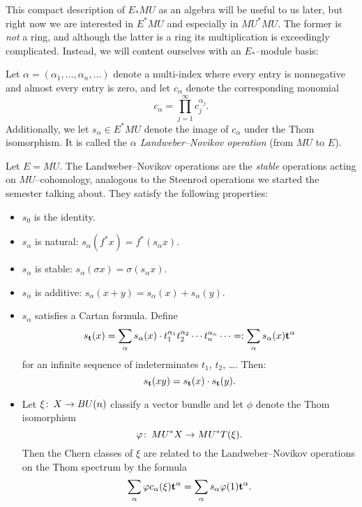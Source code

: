 \noindent This compact description of $E_* MU$ as an algebra will be useful to us later, but right now we are interested in $E^* MU$ and especially in $MU^* MU$.  The former is \emph{not} a ring, and although the latter is a ring its multiplication is exceedingly complicated.  Instead, we will content ourselves with an $E_*$--module basis:
\begin{definition}
Let $\alpha = (\alpha_1, \ldots, \alpha_n, \ldots)$ denote a multi-index where every entry is nonnegative and almost every entry is zero, and let $c_\alpha$ denote the corresponding monomial \[c_\alpha = \prod_{j=1}^\infty c_j^{\alpha_j}.\]  Additionally, we let $s_\alpha \in E^* MU$ denote the image of $c_\alpha$ under the Thom isomorphism.  It is called the \textit{$\alpha${\th} Landweber--Novikov operation} (from $MU$ to $E$).
\end{definition}

\begin{remark}
Let $E = MU$.  The Landweber--Novikov operations are the \emph{stable} operations acting on $MU$--cohomology, analogous to the Steenrod operations we started the semester talking about.  They satisfy the following properties:
\begin{itemize}
\item $s_0$ is the identity.
\item $s_\alpha$ is natural: $s_\alpha(f^* x) = f^*(s_\alpha x)$.
\item $s_\alpha$ is stable: $s_\alpha(\sigma x) = \sigma(s_\alpha x)$.
\item $s_\alpha$ is additive: $s_\alpha(x + y) = s_\alpha(x) + s_\alpha(y)$.
\item $s_\alpha$ satisfies a Cartan formula.  Define \[s_{\mathbf t}(x) = \sum_\alpha s_\alpha(x) \cdot t_1^{\alpha_1} t_2^{\alpha_2} \cdots t_n^{\alpha_n} \cdots =: \sum_{\alpha} s_\alpha(x) \mathbf t^\alpha\] for an infinite sequence of indeterminates $t_1$, $t_2$, \ldots.  Then: \[s_{\mathbf t}(x y) = s_{\mathbf t}(x) \cdot s_{\mathbf t}(y).\]
\item Let $\xi\colon\thinspace X \to BU(n)$ classify a vector bundle and let $\phi$ denote the Thom isomorphism \[\varphi\colon\thinspace MU^* X \to MU^* T(\xi).\]  Then the Chern classes of $\xi$ are related to the Landweber--Novikov operations on the Thom spectrum by the formula \[\sum_\alpha \varphi c_\alpha(\xi) \mathbf t^\alpha = \sum_\alpha s_\alpha \varphi(1) \mathbf t^\alpha.\]
\end{itemize}
\end{remark}

